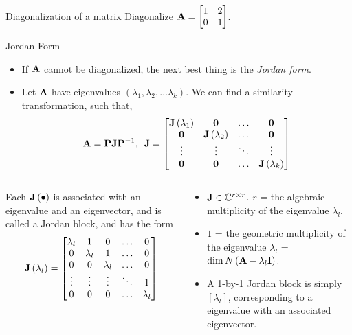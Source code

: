 \documentclass[aspectratio=169]{beamer}
\let\olditem\item
\renewcommand{\item}{\setlength{\itemsep}{\fill}\olditem}
\def\mf{\ensuremath\mathbf}
\def\mb{\ensuremath\mathbb}
\def\bmx{\ensuremath\begin{bmatrix*}[r]}
\def\emx{\ensuremath\end{bmatrix*}}
\begin{document}
\begin{frame}[t]{Diagonalization of a matrix}
Diagonalize $\mf{A} = \bmx 1 & 2\\0 & 1\emx$.
\end{frame}


\begin{frame}[t]{Jordan Form}
\begin{itemize}
    \item If $\mf{A}$ cannot be diagonalized, the next best thing is the \textit{Jordan form}.
    \item Let $\mf{A}$ have eigenvalues $\left(\lambda_1, \lambda_2, \ldots \lambda_k\right)$. We can find a similarity transformation, such that,
    \[ \mf{A} = \mf{P}\mf{J}\mf{P}^{-1}, \,\,\, \mf{J} = \begin{bmatrix*}
    \mf{J}\left(\lambda_1\right) & \mf{0} & \ldots & \mf{0}\\
    \mf{0} & \mf{J}\left(\lambda_2\right) & \ldots & \mf{0}\\
    \vdots & \vdots & \ddots & \vdots\\
    \mf{0} & \mf{0} & \ldots & \mf{J}\left(\lambda_k\right)\\
    \end{bmatrix*} \]
\end{itemize}
\begin{columns}
\begin{column}{0.5\textwidth}
\begin{footnotesize}
Each $\mf{J}\left(\bullet\right)$ is associated with an eigenvalue and an eigenvector, and  is called a Jordan block, and has the form
\[ \mf{J}\left(\lambda_l\right) = \begin{bmatrix*}
\lambda_l & 1 & 0 & \ldots & 0 \\
0 & \lambda_l & 1 & \ldots & 0 \\
0 & 0 & \lambda_l & \ldots & 0 \\
\vdots & \vdots & \vdots & \ddots & 1 \\
0 & 0 & 0 & \ldots & \lambda_l \\
\end{bmatrix*} \]
\end{footnotesize}
\end{column}
\begin{column}{0.5\textwidth}
\begin{footnotesize}
\begin{itemize}
    \item $\mf{J} \in \mb{C}^{r \times r}$. $r$ = the algebraic multiplicity of the eigenvalue $\lambda_l$.
    \item $1$ = the geometric multiplicity of the eigenvalue $\lambda_l$ = $\dim N\left(\mf{A} - \lambda_l\mf{I}\right)$.
    \item A 1-by-1 Jordan block is simply $[\lambda_l]$, corresponding to a eigenvalue with an associated eigenvector.
\end{itemize}
\end{footnotesize}
\end{column}
\end{columns}
\end{frame}
\end{document}
